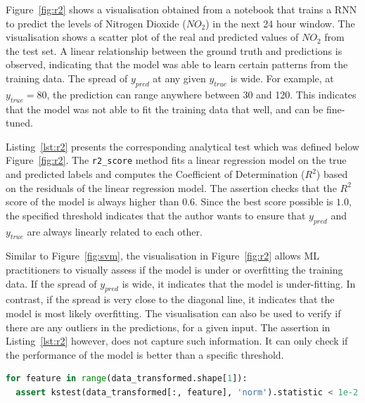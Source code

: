 Figure~\ref{fig:r2} shows a visualisation obtained from a notebook that trains a RNN to predict the levels of Nitrogen Dioxide ($NO_2$) in the next 24 hour window. The visualisation shows a scatter plot of the real and predicted values of $NO_2$ from the test set. A linear relationship between the ground truth and predictions is observed, indicating that the model was able to learn certain patterns from the training data. The spread of $y_{pred}$ at any given $y_{true}$ is wide. For example, at $y_{true} = 80$, the prediction can range anywhere between 30 and 120. This indicates that the model was not able to fit the training data that well, and can be fine-tuned.

Listing~\ref{lst:r2} presents the corresponding analytical test which was defined below Figure~\ref{fig:r2}. The \texttt{r2\_score} method fits a linear regression model on the true and predicted labels and computes the Coefficient of Determination ($R^2$) based on the residuals of the linear regression model. The assertion checks that the $R^2$ score of the model is always higher than $0.6$. Since the best score possible is $1.0$, the specified threshold indicates that the author wants to ensure that $y_{pred}$ and $y_{true}$ are always linearly related to each other.

Similar to Figure~\ref{fig:svm}, the visualisation in Figure~\ref{fig:r2} allows ML practitioners to visually assess if the model is under or overfitting the training data. If the spread of $y_{pred}$ is wide, it indicates that the model is under-fitting. In contrast, if the spread is very close to the diagonal line, it indicates that the model is most likely overfitting. The visualisation can also be used to verify if there are any outliers in the predictions, for a given input. The assertion in Listing~\ref{lst:r2} however, does not capture such information. It can only check if the performance of the model is better than a specific threshold.

\begin{lstlisting}[language=Python, caption={Assertion to check that each feature in a dataset is normal using the Kolmogorov-Smirnov test for goodness of fit from the scipy library.}, label={lst:kstest}]
for feature in range(data_transformed.shape[1]):
  assert kstest(data_transformed[:, feature], 'norm').statistic < 1e-2
\end{lstlisting}


